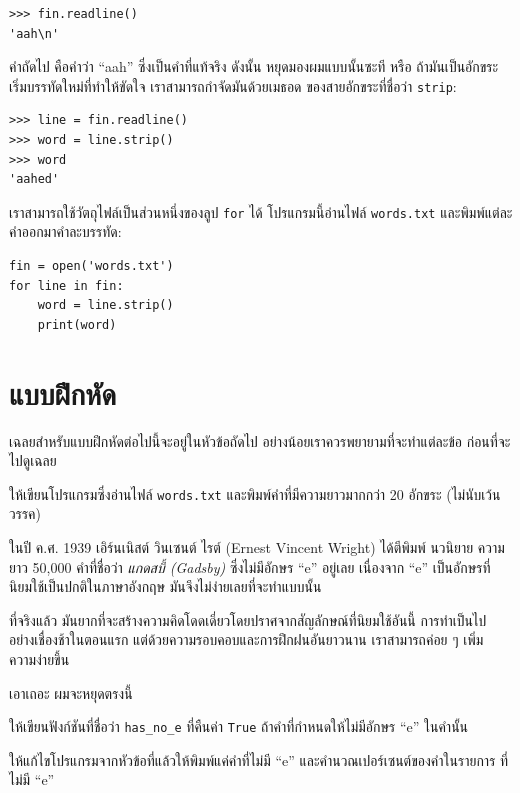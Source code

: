 \begin{verbatim}
>>> fin.readline()
'aah\n'
\end{verbatim}
% 
คำถัดไป คือคำว่า ``aah'' ซึ่งเป็นคำที่แท้จริง ดังนั้น หยุดมองผมแบบนั้นซะที
หรือ ถ้ามันเป็นอักขระเริ่มบรรทัดใหม่ที่ทำให้ขัดใจ เราสามารถกำจัดมันด้วยเมธอด
ของสายอักขระที่ชื่อว่า {\tt strip}:

\begin{verbatim}
>>> line = fin.readline()
>>> word = line.strip()
>>> word
'aahed'
\end{verbatim}
%
เราสามารถใช้วัตถุไฟล์เป็นส่วนหนึ่งของลูป {\tt for} ได้ โปรแกรมนี้อ่านไฟล์ {\tt words.txt}
และพิมพ์แต่ละคำออกมาคำละบรรทัด:

\begin{verbatim}
fin = open('words.txt')
for line in fin:
    word = line.strip()
    print(word)
\end{verbatim}
%

\section{แบบฝึกหัด}

เฉลยสำหรับแบบฝึกหัดต่อไปนี้จะอยู่ในหัวข้อถัดไป อย่างน้อยเราควรพยายามที่จะทำแต่ละข้อ
ก่อนที่จะไปดูเฉลย

\begin{exercise}
ให้เขียนโปรแกรมซึ่งอ่านไฟล์ {\tt words.txt} และพิมพ์คำที่มีความยาวมากกว่า
20 อักขระ (ไม่นับเว้นวรรค)

\end{exercise}

\begin{exercise}

ในปี ค.ศ. 1939 เอิร์นเนิสต์ วินเซนต์ ไรต์ (Ernest Vincent Wright) ได้ตีพิมพ์ นวนิยาย
ความยาว 50,000 คำที่ชื่อว่า {\em แกดสบี้ (Gadsby)} ซึ่งไม่มีอักษร ``e'' อยู่เลย
เนื่องจาก ``e'' เป็นอักษรที่นิยมใช้เป็นปกติในภาษาอังกฤษ มันจึงไม่ง่ายเลยที่จะทำแบบนั้น

ที่จริงแล้ว มันยากที่จะสร้างความคิดโดดเดี่ยวโดยปราศจากสัญลักษณ์ที่นิยมใช้อันนี้ การทำเป็นไป
อย่างเชื่องช้าในตอนแรก แต่ด้วยความรอบคอบและการฝึกฝนอันยาวนาน เราสามารถค่อย ๆ เพิ่ม
ความง่ายขึ้น

เอาเถอะ ผมจะหยุดตรงนี้

ให้เขียนฟังก์ชันที่ชื่อว่า \verb"has_no_e" ที่คืนค่า {\tt True} ถ้าคำที่กำหนดให้ไม่มีอักษร
``e'' ในคำนั้น

ให้แก้ไขโปรแกรมจากหัวข้อที่แล้วให้พิมพ์แค่คำที่ไม่มี ``e'' และคำนวณเปอร์เซนต์ของคำในรายการ
ที่ไม่มี ``e''

\end{exercise}


